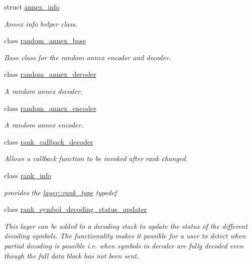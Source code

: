 \begin{DoxyCompactItemize}
struct \hyperlink{structkodo_1_1annex__info}{annex\-\_\-info}
\begin{DoxyCompactList}\small\item\em Annex info helper class. \end{DoxyCompactList}\item 
class \hyperlink{classkodo_1_1random__annex__base}{random\-\_\-annex\-\_\-base}
\begin{DoxyCompactList}\small\item\em Base class for the random annex encoder and decoder. \end{DoxyCompactList}\item 
class \hyperlink{classkodo_1_1random__annex__decoder}{random\-\_\-annex\-\_\-decoder}
\begin{DoxyCompactList}\small\item\em A random annex decoder. \end{DoxyCompactList}\item 
class \hyperlink{classkodo_1_1random__annex__encoder}{random\-\_\-annex\-\_\-encoder}
\begin{DoxyCompactList}\small\item\em A random annex encoder. \end{DoxyCompactList}\item 
class \hyperlink{classkodo_1_1rank__callback__decoder}{rank\-\_\-callback\-\_\-decoder}
\begin{DoxyCompactList}\small\item\em Allows a callback function to be invoked after rank changed. \end{DoxyCompactList}\item 
class \hyperlink{classkodo_1_1rank__info}{rank\-\_\-info}
\begin{DoxyCompactList}\small\item\em provides the \hyperlink{classlayer_a1de820b75c9af3faf024dee2b22599e4}{layer\-::rank\-\_\-type} typedef \end{DoxyCompactList}\item 
class \hyperlink{classkodo_1_1rank__symbol__decoding__status__updater}{rank\-\_\-symbol\-\_\-decoding\-\_\-status\-\_\-updater}
\begin{DoxyCompactList}\small\item\em This layer can be added to a decoding stack to update the status of the different decoding symbols. The functionality makes it possible for a user to detect when partial decoding is possible i.\-e. when symbols in decoder are fully decoded even though the full data block has not been sent. \end{DoxyCompactList}\item 

\end{DoxyCompactItemize}
